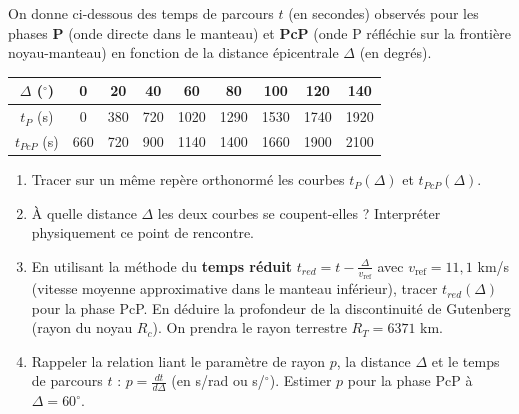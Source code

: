 \documentclass[11pt]{article}
\begin{document}
\begin{exercice}
On donne ci-dessous des temps de parcours $t$ (en secondes) observés pour les phases \textbf{P} (onde directe dans le manteau) et \textbf{PcP} (onde P réfléchie sur la frontière noyau-manteau) en fonction de la distance épicentrale $\Delta$ (en degrés).

\begin{center}
\begin{tabular}{|c|cccccccc|}\hline
$\Delta$ ($^\circ$) & 0 & 20 & 40 & 60 & 80 & 100 & 120 & 140 \\ \hline
$t_P$ (s) & 0 & 380 & 720 & 1020 & 1290 & 1530 & 1740 & 1920 \\
$t_{PcP}$ (s) & 660 & 720 & 900 & 1140 & 1400 & 1660 & 1900 & 2100 \\ \hline
\end{tabular}
\end{center}
\begin{enumerate}
    \item Tracer sur un même repère orthonormé les courbes $t_P(\Delta)$ et $t_{PcP}(\Delta)$.
    \item À quelle distance $\Delta$ les deux courbes se coupent-elles ? Interpréter physiquement ce point de rencontre.
    \item En utilisant la méthode du \textbf{temps réduit} $t_{red} = t - \frac{\Delta}{v_{\text{ref}}}$ avec $v_{\text{ref}} = 11,1$ km/s (vitesse moyenne approximative dans le manteau inférieur), tracer $t_{red}(\Delta)$ pour la phase PcP. En déduire la profondeur de la discontinuité de Gutenberg (rayon du noyau $R_c$). On prendra le rayon terrestre $R_T = 6371$ km.
    \item Rappeler la relation liant le paramètre de rayon $p$, la distance $\Delta$ et le temps de parcours $t$ : $p = \frac{dt}{d\Delta}$ (en s/rad ou s/$^\circ$). Estimer $p$ pour la phase PcP à $\Delta = 60^\circ$.
\end{enumerate}
\end{exercice}
\end{document}
